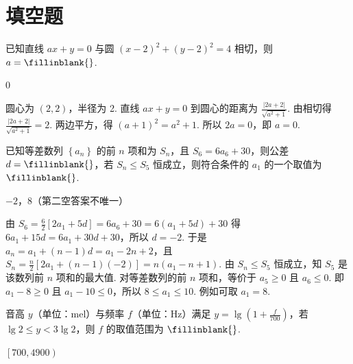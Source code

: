 \documentclass[UTF8,a4paper,oneside,11pt]{ctexbook}
\begin{document}
\section{填空题}

\begin{problem}
已知直线 \( ax+y=0 \) 与圆 \( \left( x-2 \right)^2+\left( y-2 \right)^2=4 \) 相切，则 \( a=\fillinblank{} \).
\end{problem}

\begin{answer}
0
\end{answer}

\begin{solution}
圆心为 \( \left( 2,2 \right) \)，半径为 2. 直线 \( ax+y=0 \) 到圆心的距离为 \( \frac{\left| 2a+2 \right|}{\sqrt{a^2+1}} \). 由相切得 \( \frac{\left| 2a+2 \right|}{\sqrt{a^2+1}}=2 \). 两边平方，得 \( \left( a+1 \right)^2=a^2+1 \).
所以 \( 2a=0 \)，即 \( a=0 \).
\end{solution}

\begin{problem}
已知等差数列 \( \left\{ a_n \right\} \) 的前 \( n \) 项和为 \( S_n \)，且 \( S_6=6a_6+30 \)，则公差 \( d=\fillinblank{} \)，若 \( S_n\le S_5 \) 恒成立，则符合条件的 \( a_1 \) 的一个取值为 \(\fillinblank{} \).
\end{problem}

\begin{answer}
\(-2\)，\(8\)（第二空答案不唯一）
\end{answer}

\begin{solution}
由 \( S_6=\frac{6}{2}\left[ 2a_1+5d \right]=6a_6+30=6\left( a_1+5d \right)+30 \) 得 \( 6a_1+15d=6a_1+30d+30 \)，所以 \( d=-2 \).
于是 \( a_n=a_1+\left( n-1 \right)d=a_1-2n+2 \)，且 \( S_n=\frac{n}{2}\left[ 2a_1+\left( n-1 \right)\left( -2 \right) \right]=n\left( a_1-n+1 \right) \).
由 \( S_n\le S_5 \) 恒成立，知 \(S_5\) 是该数列前 \( n \) 项和的最大值. 对等差数列的前 \( n \) 项和，等价于 \( a_5\ge 0 \) 且 \( a_6\le 0 \). 即 \( a_1-8\ge 0 \) 且 \( a_1-10\le 0 \)，所以 \( 8\le a_1\le 10 \). 例如可取 \( a_1=8 \).
\end{solution}

\begin{problem}
音高 \( y \)（单位：mel）与频率 \( f \)（单位：Hz）满足 \( y=\lg \left( 1+\frac{f}{700} \right) \)，若 \( \lg 2\le y<3\lg 2 \)，则 \( f \) 的取值范围为 \(\fillinblank{} \).
\end{problem}

\begin{answer}
\( \left[ 700,4900 \right) \)
\end{answer}
\end{document}
